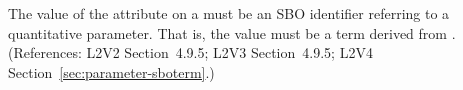 The value of the  attribute on a \Parameter must be an SBO
identifier referring to a quantitative parameter.  That is, the value must
be a term derived from \sboparameter.  (References: L2V2 Section~4.9.5; L2V3
Section~4.9.5; L2V4 Section~\ref{sec:parameter-sboterm}.)
